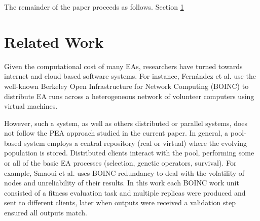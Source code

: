\documentclass{sig-alternate}
\begin{document}
%

The remainder of the paper proceeds as follows. Section \ref{sec:work} 

\section{Related Work}
\label{sec:work}
Given the computational cost of many EAs, researchers have turned towards internet and cloud based software systems.
For instance, Fern\'andez et al. \cite{nc}%
use the well-known Berkeley Open Infrastructure for Network Computing (BOINC) to distribute EA runs across a
heterogeneous network of volunteer computers using virtual machines.

However, such a system, as well as others distributed or parallel systems, does not follow the PEA approach studied in the current paper.
In general, a pool-based system employs a central repository (real or virtual) where the evolving population is stored.
Distributed clients interact with the pool, performing some or all of the basic EA processes (selection, genetic operators, survival). 
For example, Smaoui et al. \cite{FekiNG09} uses BOINC redundancy
to deal with the volatility of nodes and unreliability of their results. 
In this work each BOINC work unit consisted of a fitness evaluation task and
multiple replicas were produced and sent to different clients, later when 
outputs were received a validation step ensured all outputs match.
\end{document}
